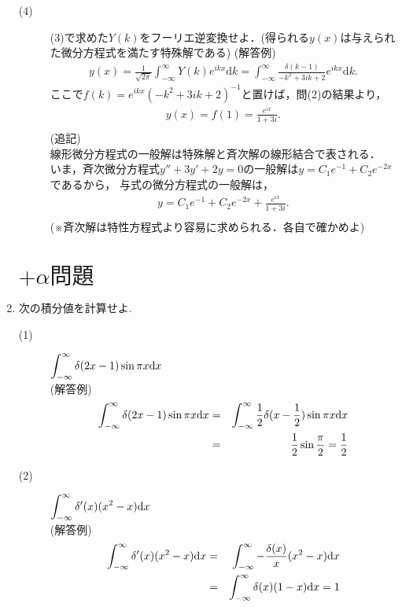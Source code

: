 \documentclass[11pt]{jsarticle}
\begin{document}
\begin{enumerate}
\begin{description}
\item[(4)] (3)で求めた$Y(k)$をフーリエ逆変換せよ．(得られる$y(x)$は与えられた微分方程式を満たす特殊解である)
(解答例)\\[8pt]
%
\begin{eqnarray*}
y(x)=\frac{1}{\sqrt{2\pi}}\int^{\infty}_{-\infty}Y(k)e^{ikx}\mathrm{d}k =
\int^{\infty}_{-\infty}\frac{\delta(k-1)}{-k^2+3ik+2}e^{ikx}\mathrm{d}k.
\end{eqnarray*}
%
ここで$f(k)=e^{ikx}\left(-k^2+3ik+2 \right)^{-1}$と置けば，問(2)の結果より，
%
\begin{eqnarray*}
y(x)=f(1)=\frac{e^{ix}}{1+3i}.\\
\end{eqnarray*}
%
(追記)\\[5pt]
線形微分方程式の一般解は特殊解と斉次解の線形結合で表される．\\
いま，斉次微分方程式$y''+3y'+2y=0$の一般解は$y=C_1e^{-1}+C_2e^{-2x}$であるから，
与式の微分方程式の一般解は，
%
\begin{eqnarray*}
y=C_1e^{-1}+C_2e^{-2x}+\frac{e^{ix}}{1+3i}.\\
\end{eqnarray*}
%
(※斉次解は特性方程式より容易に求められる．各自で確かめよ)
\end{description}

\newpage
\section*{$+\alpha 問題$}
\item 次の積分値を計算せよ.\\
\begin{description}
\item[(1)] $\displaystyle{\int_{-\infty}^{\infty} \delta (2x-1)\sin{\pi x} {\rm d}x}$\\
(解答例)
\begin{eqnarray*}
\int_{-\infty}^{\infty} \delta (2x-1)\sin{\pi x} {\rm d}x &=& \int_{-\infty}^{\infty} \frac{1}{2}\delta (x-\frac{1}{2})\sin{\pi x} {\rm d}x\\
 &=& \frac{1}{2}\sin{\frac{\pi}{2}} = \frac{1}{2}
\end{eqnarray*}

\vspace{60mm}
\item[(2)] $\displaystyle{\int_{-\infty}^{\infty} \delta '(x)(x^2-x) {\rm d}x}$\\
(解答例)
\begin{eqnarray*}
\int_{-\infty}^{\infty} \delta '(x)(x^2-x) {\rm d}x &=& \int_{-\infty}^{\infty} -\frac{\delta (x)}{x} (x^2-x) {\rm d}x\\
&=& \int_{-\infty}^{\infty} \delta (x)(1-x) {\rm d}x = 1
\end{eqnarray*}
\end{description}




\end{enumerate}
\end{document}
